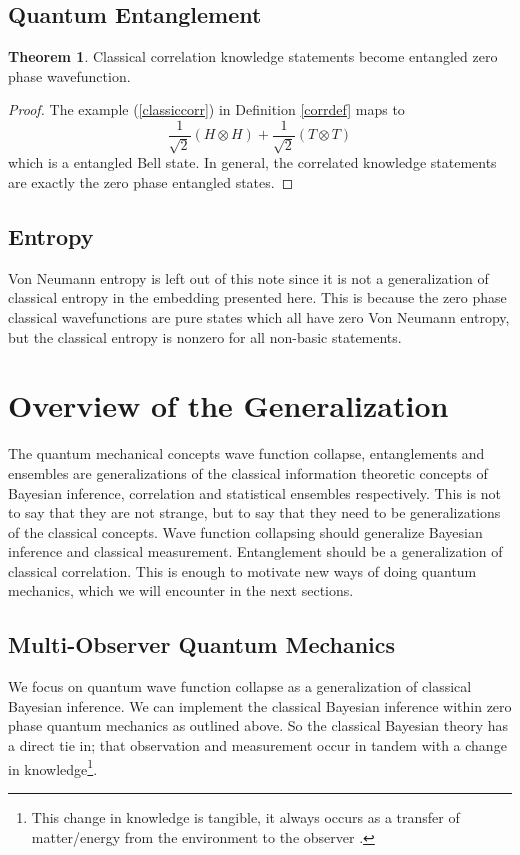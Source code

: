 \documentclass[12pt,a4paper]{article}
\theoremstyle{myrule}
\theoremstyle{postulate}
\theoremstyle{definition}
\newtheorem{theorem}{Theorem}[section]
\begin{document}
\subsection{Quantum Entanglement}
\begin{theorem}
  Classical correlation knowledge statements become entangled zero phase wavefunction.
\end{theorem}
\begin{proof}
  The example (\ref{classiccorr}) in Definition \ref{corrdef} maps to
  \[
  \frac{1}{\sqrt{2}} (H \otimes H) + \frac{1}{\sqrt{2}} (T \otimes T)
  \]
which is a entangled Bell state.  In general, the correlated knowledge statements are exactly the zero phase entangled states.
\end{proof}
\subsection{Entropy}
Von Neumann entropy is left out of this note since it is not a generalization of classical entropy in the embedding presented here.  This is because the zero phase classical wavefunctions are pure states which all have zero Von Neumann entropy, but the classical entropy is nonzero for all non-basic statements.

\section{Overview of the Generalization}

The quantum mechanical concepts wave function collapse, entanglements and ensembles are generalizations of the classical information theoretic concepts of Bayesian inference, correlation and statistical ensembles respectively.  This is not to say that they are not strange, but to say that they need to be generalizations of the classical concepts.  Wave function collapsing should generalize Bayesian inference and classical measurement.  Entanglement should be a generalization of classical correlation.  This is enough to motivate new ways of doing quantum mechanics, which we will encounter in the next sections.

\subsection{Multi-Observer Quantum Mechanics}
We focus on quantum wave function collapse as a generalization of classical Bayesian inference.  We can implement the classical Bayesian inference within zero phase quantum mechanics as outlined above.  So the classical Bayesian theory has a direct tie in; that observation and measurement occur in tandem with a change in knowledge\footnote{This change in knowledge is tangible, it always occurs as a transfer of matter/energy from the environment to the observer \cite{thrust}.}.  
\end{document}
